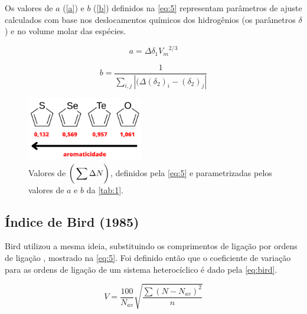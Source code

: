 
Os valores de $a$ (\autoref{a}) e $b$ (\autoref{b}) definidos na \autoref{eq:5} representam parâmetros de ajuste calculados com base nos deslocamentos químicos dos hidrogênios (os parâmetros $\delta$) e no volume molar das espécies.

\begin{equation}
\label{a}
    a = \Delta \delta_1 {V_m}^{2/3}
\end{equation}

\begin{equation}
\label{b}
    b = \frac{1}{\displaystyle \sum_{i,j} |(\Delta (\delta_2)_i - (\delta_2)_j|}
\end{equation}


\begin{figure}[htb]
	\caption{\label{fig:4} Valores de $\bigg{(} \displaystyle \sum \Delta N \bigg{)}$, definidos pela \autoref{eq:5} e parametrizadas pelos valores de $a$ e $b$ da \autoref{tab:1}.}
	\begin{center}
		\includegraphics[width=0.45\textwidth]{images/aromaticity(1).png}
	\end{center}
\end{figure}

\subsection{Índice de Bird (1985)}

Bird \autocite{Bird1985, Bird1986, Bird1992} utilizou a mesma ideia, substituindo os comprimentos de ligação por ordens de ligação \autocite{Gordy1947}, mostrado na \autoref{eq:5}. Foi definido então que o coeficiente de variação para as ordens de ligação de um sistema heterocíclico é dado pela \autoref{eq:bird}.

\begin{equation}
\label{eq:bird}
    V = \frac{100}{N_{av}} \sqrt{\displaystyle \frac{\displaystyle \sum (N - N_{av})^2}{n}}
\end{equation}

